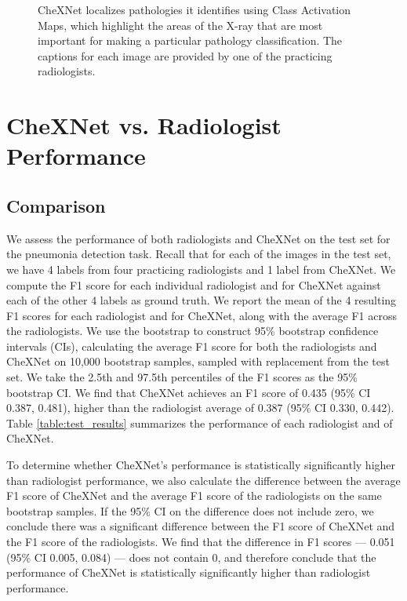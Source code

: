\documentclass{article}
\begin{document}
\begin{figure*}[ht!]
\caption{CheXNet localizes pathologies it identifies using Class Activation Maps, which highlight the areas of the X-ray that are most important for making a particular pathology classification. The captions for each image are provided by one of the practicing radiologists.}
\label{fig:cams}
\end{figure*}

\section{CheXNet vs. Radiologist Performance}
\subsection{Comparison}
We assess the performance of both radiologists and CheXNet on the test set for the pneumonia detection task. Recall that for each of the images in the test set, we have 4 labels from four practicing radiologists and 1 label from CheXNet. We compute the F1 score for each individual radiologist and for CheXNet against each of the other 4 labels as ground truth. We report the mean of the 4 resulting F1 scores for each radiologist and for CheXNet, along with the average F1 across the radiologists. We use the bootstrap to construct 95\% bootstrap confidence intervals (CIs), calculating the average F1 score for both the radiologists and CheXNet on 10,000 bootstrap samples, sampled with replacement from the test set. We take the 2.5th and 97.5th percentiles of the F1 scores as the 95\% bootstrap CI. We find that CheXNet achieves an F1 score of 0.435 (95\% CI 0.387, 0.481), higher than the radiologist average of 0.387 (95\% CI 0.330, 0.442). Table \ref{table:test_results} summarizes the performance of each radiologist and of CheXNet.

To determine whether CheXNet's performance is statistically significantly higher than radiologist performance, we also calculate the difference between the average F1 score of CheXNet and the average F1 score of the radiologists on the same bootstrap samples. If the 95\% CI on the difference does not include zero, we conclude there was a significant difference between the F1 score of CheXNet and the F1 score of the radiologists. We find that the difference in F1 scores --- 0.051 (95\% CI 0.005, 0.084) --- does not contain 0, and therefore conclude that the performance of CheXNet is statistically significantly higher than radiologist performance.
\end{document}
